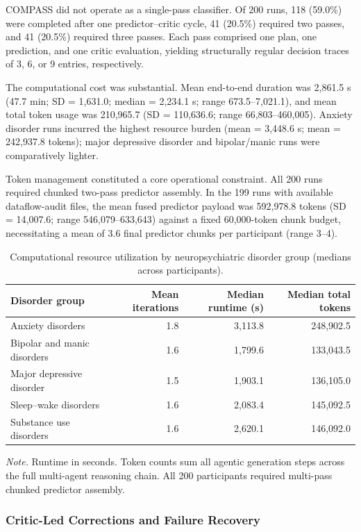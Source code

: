 \documentclass[11pt,a4paper,twoside]{article}
\begin{document}
COMPASS did not operate as a single-pass classifier. Of 200 runs, 118 (59.0\%) were completed after one predictor--critic cycle, 41 (20.5\%) required two passes, and 41 (20.5\%) required three passes. Each pass comprised one plan, one prediction, and one critic evaluation, yielding structurally regular decision traces of 3, 6, or 9 entries, respectively.

The computational cost was substantial. Mean end-to-end duration was 2,861.5 s (47.7 min; SD = 1,631.0; median = 2,234.1 s; range 673.5--7,021.1), and mean total token usage was 210,965.7 (SD = 110,636.6; range 66,803--460,005). Anxiety disorder runs incurred the highest resource burden (mean = 3,448.6 s; mean = 242,937.8 tokens); major depressive disorder and bipolar/manic runs were comparatively lighter.

Token management constituted a core operational constraint. All 200 runs required chunked two-pass predictor assembly. In the 199 runs with available dataflow-audit files, the mean fused predictor payload was 592,978.8 tokens (SD = 14,007.6; range 546,079--633,643) against a fixed 60,000-token chunk budget, necessitating a mean of 3.6 final predictor chunks per participant (range 3--4).
\begin{table}[H]
\caption{Computational resource utilization by neuropsychiatric disorder group (medians across participants).}
\label{tab:t4}
\small
\begin{tabular}{l r r r}
\toprule
Disorder group & Mean iterations & Median runtime (s) & Median total tokens \\
\midrule
Anxiety disorders & 1.8 & 3,113.8 & 248,902.5 \\
Bipolar and manic disorders & 1.6 & 1,799.6 & 133,043.5 \\
Major depressive disorder & 1.5 & 1,903.1 & 136,105.0 \\
Sleep--wake disorders & 1.6 & 2,083.4 & 145,092.5 \\
Substance use disorders & 1.6 & 2,620.1 & 146,092.0 \\
\bottomrule
\end{tabular}
\par\smallskip\noindent\small\textit{Note.} Runtime in seconds. Token counts sum all agentic generation steps across the full multi-agent reasoning chain. All 200 participants required multi-pass chunked predictor assembly.
\end{table}

\subsubsection{Critic-Led Corrections and Failure Recovery}
\end{document}
